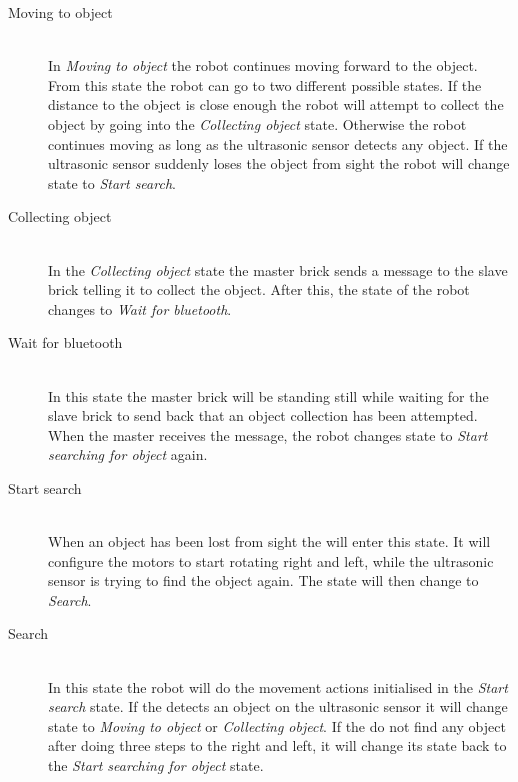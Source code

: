 \begin{description}
\item[Moving to object] \hfill \\
In \emph{Moving to object} the robot continues moving forward to the object. From this state the robot can go to two different possible states. If the distance to the object is close enough the robot will attempt to collect the object by going into the \emph{Collecting object} state. Otherwise the robot continues moving as long as the ultrasonic sensor detects any object. If the ultrasonic sensor suddenly loses the object from sight the robot will change state to \emph{Start search}.

\item[Collecting object] \hfill \\
In the \emph{Collecting object} state the master brick sends a message to the slave brick telling it to collect the object. After this, the state of the robot changes to \emph{Wait for bluetooth}.

\item[Wait for bluetooth] \hfill \\
In this state the master brick will be standing still while waiting for the slave brick to send back that an object collection has been attempted. When the master receives the message, the robot changes state to \emph{Start searching for object} again. 

\item[Start search] \hfill \\
When an object has been lost from sight the \projname{} will enter this state. It will configure the motors to start rotating right and left, while the ultrasonic sensor is trying to find the object again. The state will then change to \emph{Search}.

\item[Search] \hfill \\
In this state the robot will do the movement actions initialised in the \emph{Start search} state. If the \projname{} detects an object on the ultrasonic sensor it will change state to \emph{Moving to object} or \emph{Collecting object}. If the \projname{} do not find any object after doing three steps to the right and left, it will change its state back to the \emph{Start searching for object} state. 
\end{description}

